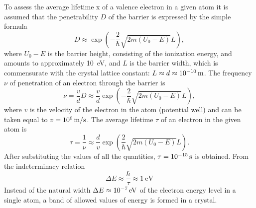 To assess the average lifetime x of a valence electron in a given atom it is assumed that the penetrability $D$ of the barrier is expressed by the simple formula 
\begin{equation*}%
D \approx \exp \left( -\frac{2}{\hbar} \sqrt{2m(U_{0}- E) } L \right),
\end{equation*}
where $U_{0} - E$ is the barrier height, consisting of the ionization energy, and amounts to approximately \approx \SI{10}{\electronvolt}, and $L$ is the barrier width, which is commensurate with the crystal lattice constant: $L \approx  d \approx \SI{d-10}{\meter}$. The frequency $\nu$ of penetration of an electron through the barrier is
\begin{equation*}%
\nu  = \frac{v}{d} D \approx \frac{v}{d} \exp \left( -\frac{2}{\hbar} \sqrt{2m(U_{0}- E) } L \right),
\end{equation*}
where $v$ is the velocity of the electron in the atom (potential well) and can be taken equal to $v = \SI{d6}{\meter\per\second}$. The average lifetime $\tau$ of an electron in the given atom is 
\begin{equation*}%
\tau  = \frac{1}{\nu}  \approx \frac{d}{v} \exp \left(\frac{2}{\hbar} \sqrt{2m(U_{0}- E) } L \right).
\end{equation*}
After substituting the values of all the quantities, $\tau = \SI{d-15}{\second}$ is obtained. From the indeterminacy relation
\begin{equation*}%
\Delta E \approx \frac{\hbar}{\tau} \approx \SI{1}{\electronvolt}
\end{equation*}
Instead of the natural width $\Delta E \approx \SI{d-7}{\electronvolt}$ of the electron energy level in a single atom, a band of allowed values of energy is formed in a crystal.

